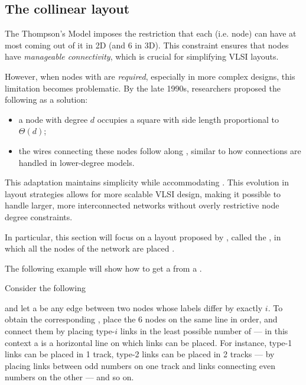 \documentclass[a4paper, 12pt]{report}
\begin{document}
    \subsection{The collinear layout}

    The Thompson's Model imposes the restriction that each  (i.e. node) can have at most  coming out of it in 2D (and 6 in 3D). This constraint ensures that nodes have \textit{manageable connectivity}, which is crucial for simplifying VLSI layouts.

    However, when nodes with  are \textit{required}, especially in more complex designs, this limitation becomes problematic. By the late 1990s, researchers proposed the following  as a solution:

    \begin{itemize}
        \item a node with degree $d$ occupies a square with side length proportional to $\Theta(d)$;
        \item the wires connecting these nodes follow  along , similar to how connections are handled in lower-degree models.
    \end{itemize}

    This adaptation maintains simplicity while accommodating . This evolution in layout strategies allows for more scalable VLSI design, making it possible to handle larger, more interconnected networks without overly restrictive node degree constraints.

    In particular, this section will focus on a layout proposed by \textcite{yeh}, called the , in which all the nodes of the network are placed .

    The following example will show how to get a  from a .

    \begin{example}
        Consider the following 


        and let a  be any edge between two nodes whose labels differ by exactly $i$. To obtain the corresponding , place the 6 nodes on the same line in order, and connect them by placing type-$i$ links in the least possible number of  --- in this context a  is a horizontal line on which links can be placed. For instance, type-1 links can be placed in 1 track, type-2 links can be placed in 2 tracks --- by placing links between odd numbers on one track and links connecting even numbers on the other --- and so on.

    \end{example}
\end{document}
